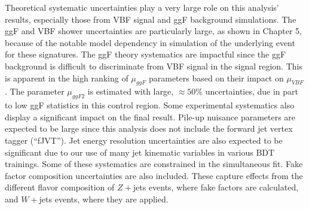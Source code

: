 Theoretical systematic uncertainties play a very large role on this analysis' results, especially those from VBF signal and ggF background simulations. The ggF and VBF shower uncertainties are particularly large, as shown in Chapter 5, because of the notable model dependency in simulation of the underlying event for these signatures. The ggF theory systematics are impactful since the ggF background is difficult to discriminate from VBF signal in the signal region. This is apparent in the high ranking of $\mu_{ggF}$ parameters based on their impact on $\mu_{VBF}$. The parameter $\mu_{ggF2}$ is estimated with large, $\approx 50\%$ uncertainties, due in part to low ggF statistics in this control region. Some experimental systematics also display a significant impact on the final result. Pile-up nuisance parameters are expected to be large since this analysis does not include the forward jet vertex tagger (``fJVT''). Jet energy resolution uncertainties are also expected to be significant due to our use of many jet kinematic variables in various BDT trainings. Some of these systematics are constrained in the simultaneous fit. Fake factor composition uncertainties are also included. These capture effects from the different flavor composition of $Z+$jets events, where fake factors are calculated, and $W+$jets events, where they are applied.  

